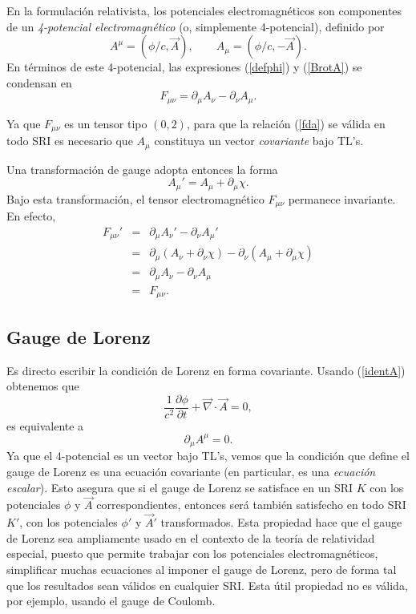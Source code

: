 En la formulación relativista, los potenciales electromagnéticos son componentes de un  \textit{4-potencial electromagnético} (o, simplemente 4-potencial), definido por
\begin{equation}
A^\mu =(\phi/c,\vec{A}), \qquad A_\mu =(\phi/c,-\vec{A}). \label{identA}
\end{equation}
En términos de este 4-potencial, las expresiones (\ref{defphi}) y (\ref{BrotA}) se condensan en
\begin{equation}
\boxed{F_{\mu \nu}=\partial_\mu A_{\nu}-\partial_{\nu}A_\mu.} \label{fda}
\end{equation}

Ya que $F_{\mu\nu}$ es un tensor tipo $(0,2)$, para que la relación (\ref{fda})
se válida en todo SRI es necesario que $A_\mu$ constituya un vector
\textit{covariante} bajo TL's.

Una transformación de gauge adopta entonces la forma
\begin{equation}
\boxed{A_\mu' = A_\mu  + \partial_\mu  \chi .}
\end{equation}
Bajo esta transformación, el tensor electromagnético $F_{\mu \nu}$ permanece
invariante. En efecto,
\begin{eqnarray}
F_{\mu\nu}'&=&\partial_\mu A_{\nu}'-\partial_{\nu}A_\mu '  \\
&=&\partial_\mu (A_{\nu}+\partial_{\nu}
\chi)-\partial_{\nu}(A_\mu +\partial_\mu  \chi)\\
&=&\partial_\mu A_{\nu}-\partial_{\nu}A_\mu  \\
&=&F_{\mu \nu}.
\end{eqnarray}

\subsection{Gauge de Lorenz}
Es directo escribir la condición de Lorenz en forma covariante. Usando
(\ref{identA}) obtenemos que
\begin{equation}
\frac{1}{c^2}\frac{\partial\phi}{\partial t}+\vec{\nabla}\cdot\vec{A}=0,
\end{equation}
es equivalente a
\begin{equation}
\partial_\mu A^\mu=0. \label{gLA}
\end{equation}
Ya que el 4-potencial es un vector bajo TL's, vemos que la condición que define el gauge de Lorenz es una ecuación covariante (en particular, es una \textit{ecuación escalar}). Esto asegura que si el gauge de Lorenz se satisface en un SRI $K$ con los potenciales $\phi$ y $\vec{A}$ correspondientes, entonces será también satisfecho en todo SRI $K'$, con los potenciales $\phi'$ y $\vec{A}'$ transformados. Esta propiedad hace que el gauge de Lorenz sea ampliamente usado en el contexto de la teoría de relatividad especial, puesto que permite trabajar con los potenciales electromagnéticos, simplificar muchas ecuaciones al imponer el gauge de Lorenz, pero de forma tal que los resultados sean válidos en cualquier SRI. Esta útil propiedad no es válida, por ejemplo, usando el gauge de Coulomb.

